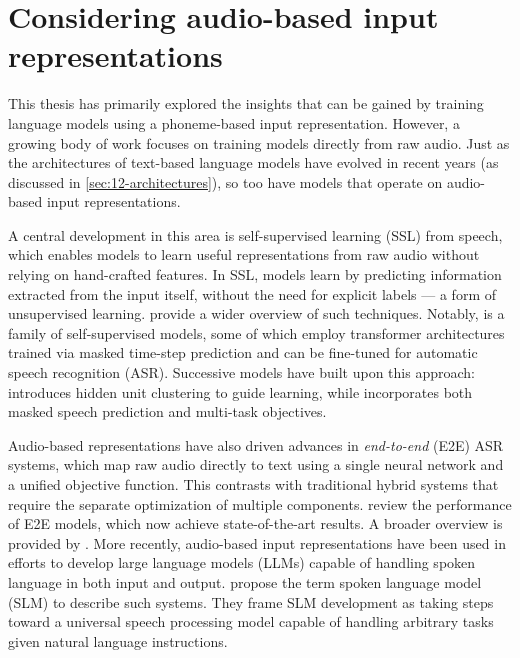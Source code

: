 
\section{Considering audio-based input representations}
\label{sec:17-audiomodels}

This thesis has primarily explored the insights that can be gained by training language models using a phoneme-based input representation. However, a growing body of work focuses on training models directly from raw audio. Just as the architectures of text-based language models have evolved in recent years (as discussed in \cref{sec:12-architectures}), so too have models that operate on audio-based input representations.

A central development in this area is self-supervised learning (SSL) from speech, which enables models to learn useful representations from raw audio without relying on hand-crafted features. In SSL, models learn by predicting information extracted from the input itself, without the need for explicit labels --- a form of unsupervised learning. \citet{mohamed2022self} provide a wider overview of such techniques. Notably,   \citep{baevski2020wav2vec} is a family of self-supervised models, some of which employ transformer architectures trained via masked time-step prediction and can be fine-tuned for automatic speech recognition (ASR). Successive models have built upon this approach:  \citep{hsu-2021-hubert} introduces hidden unit clustering to guide learning, while  \citep{chen2022wavlm} incorporates both masked speech prediction and multi-task objectives.

Audio-based representations have also driven advances in \emph{end-to-end} (E2E) ASR systems, which map raw audio directly to text using a single neural network and a unified objective function. This contrasts with traditional hybrid systems that require the separate optimization of multiple components. \citet{li2022recent} review the performance of E2E models, which now achieve state-of-the-art results. A broader overview is provided by \citet{prabhavalkar2023end}. More recently, audio-based input representations have been used in efforts to develop large language models (LLMs) capable of handling spoken language in both input and output. \citet{arora2025landscapespokenlanguagemodels} propose the term spoken language model (SLM) to describe such systems. They frame SLM development as taking steps toward a universal speech processing model capable of handling arbitrary tasks given natural language instructions.

